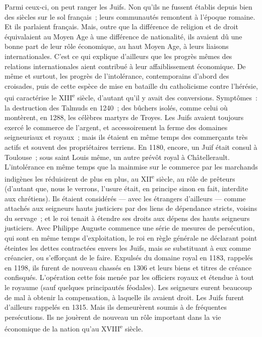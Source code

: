 \documentclass[french,twoside]{book} %
\begin{document}
\noindent Parmi ceux-ci, on peut ranger les Juifs. Non qu’ils ne fussent établis depuis bien des siècles sur le sol français ; leurs communautés remontent à l’époque romaine. Et ils parlaient français. Mais, outre que la différence de religion et de droit équivalaient au Moyen Age à une différence de nationalité, ils avaient dû une bonne part de leur rôle économique, au haut Moyen Age, à leurs liaisons internationales. C’est ce qui explique d’ailleurs que les progrès mêmes des relations internationales aient contribué à leur affaiblissement économique. De même et surtout, les progrès de l’intolérance, contemporains d’abord des croisades, puis de cette espèce de mise en bataille du catholicisme contre l’hérésie, qui caractérise le XIII\textsuperscript{e} siècle, d’autant qu’il y avait des conversions. Symptômes : la destruction des Talmuds en 1240 ; des bûchers isolés, comme celui où montèrent, en 1288, les célèbres martyrs de Troyes. Les Juifs avaient toujours exercé le commerce de l’argent, et accessoirement la ferme des domaines seigneuriaux et royaux ; mais ils étaient en même temps des commerçants très actifs et souvent des propriétaires terriens. En 1180, encore, un Juif était consul à Toulouse ; sous saint Louis même, un autre prévôt royal à Châtellerault. L’intolérance en même temps que la mainmise sur le commerce par les marchands indigènes les réduisirent de plus en plus, au XII\textsuperscript{e} siècle, au rôle de prêteurs (d’autant que, nous le verrons, l’usure était, en principe sinon en fait, interdite aux chrétiens). Ils étaient considérés — avec les étrangers d’ailleurs — comme attachés aux seigneurs hauts justiciers par des liens de dépendance stricts, voisins du servage ; et le roi tenait à étendre ses droits aux dépens des hauts seigneurs justiciers. Avec Philippe Auguste commence une série de mesures de persécution, qui sont en même temps d’exploitation, le roi en règle générale ne déclarant point éteintes les dettes contractées envers les Juifs, mais se substituant à eux comme créancier, ou s’efforçant de le faire. Expulsés du domaine royal en 1183, rappelés en 1198, ils furent de nouveau chassés en 1306 et leurs biens et titres de créance confisqués. L’opération cette fois menée par les officiers royaux et étendue à tout le royaume (sauf quelques principautés féodales). Les seigneurs eurent beaucoup de mal à obtenir la compensation, à laquelle ils avaient droit. Les Juifs furent d’ailleurs rappelés en 1315. Mais ils demeurèrent soumis à de fréquentes persécutions. Ils ne jouèrent de nouveau un rôle important dans la vie économique de la nation qu’au XVIII\textsuperscript{e} siècle.\par
\end{document}
